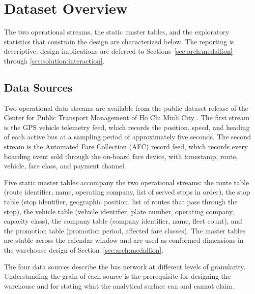 \section{Dataset Overview}
\label{sec:solution:dataset}

The two operational streams, the static master tables, and the
exploratory statistics that constrain the design are characterized
below. The reporting is descriptive; design implications are deferred
to Sections~\ref{sec:arch:medallion} through
\ref{sec:solution:interaction}.

\subsection{Data Sources}
\label{sec:solution:dataset:sources}
\label{sec:solution:fields}

Two operational data streams are available from the public dataset release of
the Center for Public Transport Management of Ho Chi Minh City
\cite{hcmcgps2025}. The first stream is the GPS vehicle telemetry feed, which
records the position, speed, and heading of each active bus at a sampling
period of approximately five seconds. The second stream is the Automated
Fare Collection (AFC) record feed, which records every boarding event sold
through the on-board fare device, with timestamp, route, vehicle, fare
class, and payment channel.

Five static master tables accompany the two operational streams: the route
table (route identifier, name, operating company, list of served stops in
order), the stop table (stop identifier, geographic position, list of routes
that pass through the stop), the vehicle table (vehicle identifier, plate
number, operating company, capacity class), the company table (company
identifier, name, fleet count), and the promotion table (promotion period,
affected fare classes). The master tables are stable across the calendar
window and are used as conformed dimensions in the warehouse design of
Section~\ref{sec:arch:medallion}.

The four data sources describe the bus network at different levels of
granularity. Understanding the grain of each source is the prerequisite for
designing the warehouse and for stating what the analytical surface can and
cannot claim.

